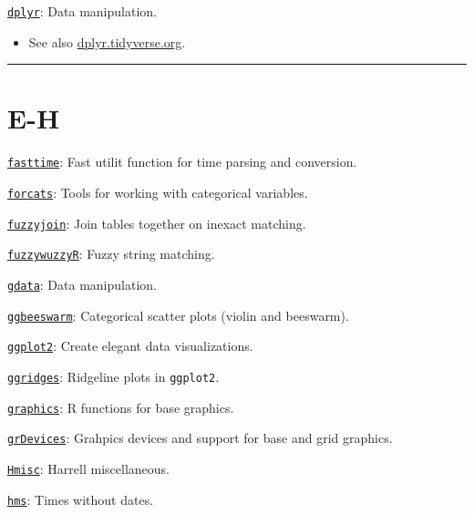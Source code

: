 \documentclass[]{book}
\providecommand{\tightlist}{%
  \setlength{\itemsep}{0pt}\setlength{\parskip}{0pt}}
\begin{document}
\href{https://CRAN.R-project.org/package=dplyr}{\texttt{dplyr}}: Data manipulation.

\begin{itemize}
\tightlist
\item
  See also \href{https://dplyr.tidyverse.org/}{dplyr.tidyverse.org}.
\end{itemize}

\begin{center}\rule{0.5\linewidth}{\linethickness}\end{center}

\hypertarget{e-h}{%
\section{E-H}\label{e-h}}

\href{https://CRAN.R-project.org/package=fasttime}{\texttt{fasttime}}: Fast utilit function for time parsing and conversion.

\href{https://CRAN.R-project.org/package=forcats}{\texttt{forcats}}: Tools for working with categorical variables.

\href{https://CRAN.R-project.org/package=fuzzyjoin}{\texttt{fuzzyjoin}}: Join tables together on inexact matching.

\href{https://CRAN.R-project.org/package=fuzzywuzzyR}{\texttt{fuzzywuzzyR}}: Fuzzy string matching.

\href{https://CRAN.R-project.org/package=gdata}{\texttt{gdata}}: Data manipulation.

\href{https://CRAN.R-project.org/package=ggbeeswarm}{\texttt{ggbeeswarm}}: Categorical scatter plots (violin and beeswarm).

\href{https://CRAN.R-project.org/package=ggplot2}{\texttt{ggplot2}}: Create elegant data visualizations.

\href{https://CRAN.R-project.org/package=ggridges}{\texttt{ggridges}}: Ridgeline plots in \texttt{ggplot2}.

\href{https://www.rdocumentation.org/packages/graphics/versions/3.5.1}{\texttt{graphics}}: R functions for base graphics.

\href{https://www.rdocumentation.org/packages/grDevices/versions/3.5.2}{\texttt{grDevices}}: Grahpics devices and support for base and grid graphics.

\href{https://CRAN.R-project.org/package=Hmisc}{\texttt{Hmisc}}: Harrell miscellaneous.

\href{https://CRAN.R-project.org/package=hms}{\texttt{hms}}: Times without dates.
\end{document}
